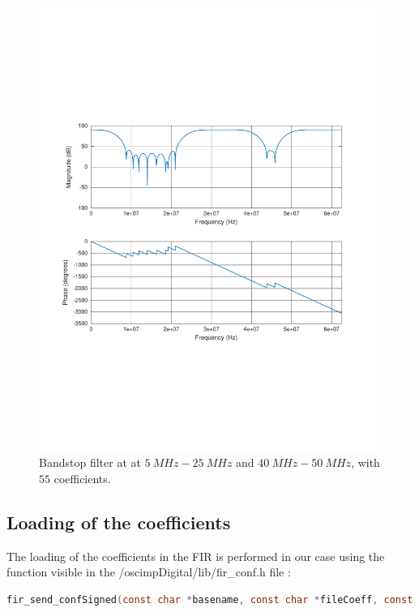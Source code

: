 \documentclass[12pt,oneside]{article}
\begin{document}
\begin{figure}[!h!tb]
	\begin{center}
		\includegraphics[width=12cm,trim={1.5cm 6.9cm 1.5cm 7cm}, clip]{curves/bs55co.pdf}
		\caption{Bandstop filter at at $5~MHz-25~MHz$ and $40~MHz-50~MHz$, with $55$ coefficients.}
		\label{curv:DSP}
	\end{center}
\end{figure}

\subsection{Loading of the coefficients}
\vspace{0.5cm}
The loading of the coefficients in the FIR is performed in our case using the function visible in the /oscimpDigital/lib/fir\_conf.h file :

\vspace{-0cm}
\begin{lstlisting}[language=C]
fir_send_confSigned(const char *basename, const char *fileCoeff, const int coeffSize);
\end{lstlisting}
\vspace{0.6cm} 
\end{document}
